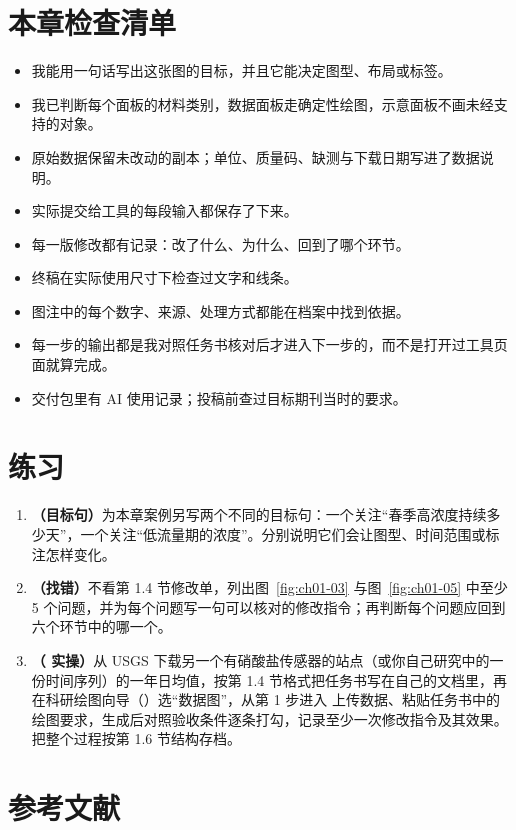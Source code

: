 \section{本章检查清单}

\begin{itemize}
\item 我能用一句话写出这张图的目标，并且它能决定图型、布局或标签。
\item 我已判断每个面板的材料类别，数据面板走确定性绘图，示意面板不画未经支持的对象。
\item 原始数据保留未改动的副本；单位、质量码、缺测与下载日期写进了数据说明。
\item 实际提交给工具的每段输入都保存了下来。
\item 每一版修改都有记录：改了什么、为什么、回到了哪个环节。
\item 终稿在实际使用尺寸下检查过文字和线条。
\item 图注中的每个数字、来源、处理方式都能在档案中找到依据。
\item 每一步的输出都是我对照任务书核对后才进入下一步的，而不是打开过工具页面就算完成。
\item 交付包里有 AI 使用记录；投稿前查过目标期刊当时的要求。
\end{itemize}

\section{练习}

\begin{enumerate}
\item \textbf{（目标句）}为本章案例另写两个不同的目标句：一个关注“春季高浓度持续多少天”，一个关注“低流量期的浓度”。分别说明它们会让图型、时间范围或标注怎样变化。
\item \textbf{（找错）}不看第 1.4 节修改单，列出图~\ref{fig:ch01-03} 与图~\ref{fig:ch01-05} 中至少 5 个问题，并为每个问题写一句可以核对的修改指令；再判断每个问题应回到六个环节中的哪一个。
\item \textbf{（\scidraw{} 实操）}从 USGS 下载另一个有硝酸盐传感器的站点（或你自己研究中的一份时间序列）的一年日均值，按第 1.4 节格式把任务书写在自己的文档里，再在科研绘图向导（）选“数据图”，从第 1 步进入  上传数据、粘贴任务书中的绘图要求，生成后对照验收条件逐条打勾，记录至少一次修改指令及其效果。把整个过程按第 1.6 节结构存档。
\end{enumerate}

\section*{参考文献}

